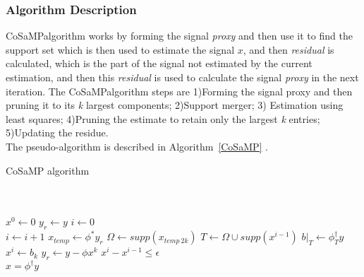 \documentclass[12pt]{article}
\theoremstyle{definition}
\def\x{$x$\hspace{0.1in}}
\def\cosamp{CoSaMP\hspace{0.1in}}
\begin{document}
\subsubsection{Algorithm Description}
\label{Sec:cosamp_algo}
\cosamp algorithm works by forming the signal \textit{proxy} and then use it to find the support set
which is then used to estimate the signal \x, and then \textit{residual} is calculated, which
is the part of the signal not estimated by the current estimation, and then this \textit{residual}
is used to calculate the signal \textit{proxy} in the next iteration.
The \cosamp algorithm steps are 1)Forming the signal proxy and then pruning it to its \textit{k} largest
components; 2)Support merger; 3) Estimation using least squares; 4)Pruning the estimate to retain only the largest
\textit{k} entries; 5)Updating the residue.\\
The pseudo-algorithm is described in Algorithm~\ref{CoSaMP} \cite{Needell-CoSaMP}.

  \begin{algorithm}
   \caption{CoSaMP algorithm}
   \label{CoSaMP}
   \begin{algorithmic}
    \\
    \\
    \State $x^0 \gets 0$
    \State $y_r \gets y$
    \State $i \gets 0$\\
    \Repeat
    \State $i \gets i+1$
    \State $x_{temp} \gets \phi^\ast y_r$
    \State $\Omega \gets supp(x_{temp \ 2k})$
    \State $T \gets \Omega \cup supp(x^{i-1})$
    \State $b|_T \gets \phi_T^\dagger y$
    \State $x^i \gets b_k$
    \State $y_r \gets y - \phi x^k$
    \Until $x^{i} - x^{i-1} \leq \epsilon$ 
    \\
    \Return $x = \phi^\dagger y$
   \end{algorithmic}
\end{algorithm}
\end{document}
